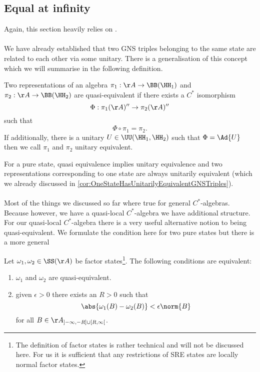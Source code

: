 \subsection{Equal at infinity}
Again, this section heavily relies on \cite{BratRob}.\\\\
We have already established that two GNS triples belonging to the same state are related to each other via some unitary. There is a generalisation of this concept which we will summarise in the following definition.
\begin{definition}
	Two representations of an algebra $\pi_1:\AA\rightarrow\BB(\HH_1)$ and $\pi_2:\AA\rightarrow\BB(\HH_2)$ are quasi-equivalent if there exists a $C^*$ isomorphism
	\begin{equation}
	\Phi:\pi_1(\AA)''\rightarrow\pi_2(\AA)''
	\end{equation}
	such that
	\begin{equation}
	\Phi\circ\pi_1=\pi_2.
	\end{equation}
	If additionally, there is a unitary $U\in\UU(\HH_1,\HH_2)$ such that $\Phi=\Ad{U}$ then we call $\pi_1$ and $\pi_2$ unitary equivalent.
\end{definition}
For a pure state, quasi equivalence implies unitary equivalence and two representations corresponding to one state are always unitarily equivalent (which we already discussed in \ref{cor:OneStateHasUnitarilyEquivalentGNSTriples}).\\\\
Most of the things we discussed so far where true for general $C^*$-algebras. Because however, we have a quasi-local $C^*$-algebra we have additional structure. For our quasi-local $C^*$-algebra there is a very useful alternative notion to being quasi-equivalent. We formulate the condition here for two pure states but there is a more general
\begin{lemma}
	Let $\omega_1,\omega_2\in\SS(\AA)$ be factor states\footnote{The definition of factor states is rather technical and will not be discussed here. For us it is sufficient that any restrictions of SRE states are locally normal factor states.}. The following conditions are equivalent:
	\begin{enumerate}
		\item $\omega_1$ and $\omega_2$ are quasi-equivalent.
		\item given $\epsilon>0$ there exists an $R>0$ such that
		\begin{equation}
		\abs{\omega_1(B)-\omega_2(B)}<\epsilon\norm{B}
		\end{equation}
		for all $B\in\AA_{]-\infty,-R]\cup [R,\infty[}$.
	\end{enumerate}
\end{lemma}
